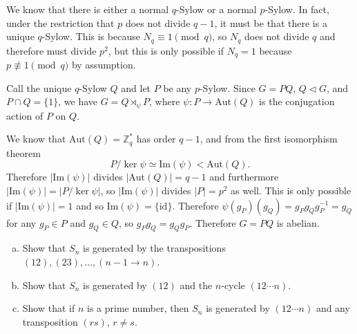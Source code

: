 \documentclass{article}
\newcounter{Problem}
\newenvironment{Problem}{\begin{Exercise}[name={Problem},
                                          counter={Problem}]}
                        {\end{Exercise}}
\begin{document}
\begin{Answer}
\begin{enumerate}
{%

    We know that there is either a normal $q$-Sylow or a normal
    $p$-Sylow. In fact, under the restriction that $p$ does not divide
    $q - 1$, it must be that there is a unique $q$-Sylow. This is
    because $N_q \equiv 1 \pmod{q}$, so $N_q$ does not divide $q$ and
    therefore must divide $p^2$, but this is only possible if $N_q =
    1$ because $p \not\equiv 1 \pmod{q}$ by assumption.

    Call the unique $q$-Sylow $Q$ and let $P$ be any $p$-Sylow.
    Since $G = PQ$, $Q \triangleleft G$, and $P \cap Q = \{ 1 \}$,
    we have $G = Q \rtimes_\psi P$, where $\psi : P \to
    \mathrm{Aut}(Q)$ is the conjugation action of $P$ on $Q$.

    We know that $\mathrm{Aut}(Q) = \mathbb{Z}_q^\ast$ has order $q -
    1$, and from the first isomorphism theorem
    $$
    P / \ker \psi \simeq \mathrm{Im}(\psi) < \mathrm{Aut}(Q).
    $$
    Therefore $|\mathrm{Im}(\psi)|$ divides
    $|\mathrm{Aut}(Q)| = q - 1$ and furthermore
    $|\mathrm{Im}(\psi)| = |P / \ker \psi|$, so $|\mathrm{Im}(\psi)|$
    divides $|P| = p^2$ as well. This is only possible if
    $|\mathrm{Im}(\psi)| = 1$ and so
    $\mathrm{Im}(\psi) = \{ \mathrm{id} \}$. Therefore
    $\psi(g_P)(g_Q) = g_P g_Q g_P^{-1} = g_Q$ for any $g_P \in P$ and
    $g_Q \in Q$, so $g_P g_Q = g_Q g_P$. Therefore $G = PQ$ is abelian.
  }
\end{enumerate}
\end{Answer}

\pagebreak

\begin{Problem}
  \begin{enumerate}[(a)]
    \item{
      Show that $S_n$ is generated by the transpositions
      $(12),(23),\dots,(n-1 \to n)$.
    }
    \item{
      Show that $S_n$ is generated by $(12)$ and the $n$-cycle
      $(12 \cdots n)$.
    }
    \item{
      Show that if $n$ is a prime number, then $S_n$ is generated by
      $(1 2 \cdots n)$ and any transposition $(rs)$, $r \neq s$.
    }
  \end{enumerate}
\end{Problem}
\end{document}
